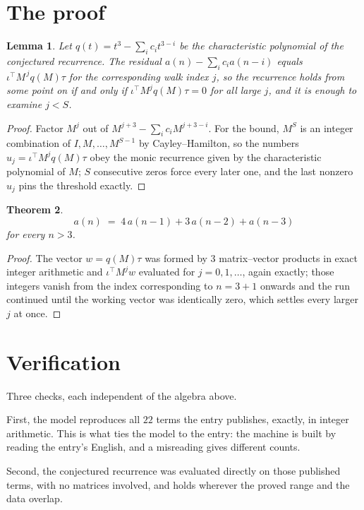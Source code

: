 \documentclass[11pt,a4paper]{article}
\theoremstyle{plain}
\newtheorem{theorem}{Theorem}
\newtheorem{lemma}[theorem]{Lemma}
\theoremstyle{definition}
\begin{document}
\section{The proof}

\begin{lemma}\label{lem:crit}
Let $q(t)=t^{3}-\sum_i c_it^{3-i}$ be the characteristic polynomial of the
conjectured recurrence. The residual $a(n)-\sum_ic_ia(n-i)$ equals
$\iota^{\!\top}M^{\,j}q(M)\tau$ for the corresponding walk index $j$, so the recurrence
holds from some point on if and only if $\iota^{\!\top}M^{j}q(M)\tau=0$ for all large $j$,
and it is enough to examine $j<S$.
\end{lemma}

\begin{proof}
Factor $M^{j}$ out of $M^{j+3}-\sum_ic_iM^{j+3-i}$. For the bound, $M^{S}$
is an integer combination of $I,M,\dots,M^{S-1}$ by Cayley--Hamilton, so the numbers
$u_j=\iota^{\!\top}M^{j}q(M)\tau$ obey the monic recurrence given by the characteristic
polynomial of $M$; $S$ consecutive zeros force every later one, and the last nonzero $u_j$
pins the threshold exactly.
\end{proof}

\begin{theorem}
\[
a(n)\;=\;4\,a(n-1) + 3\,a(n-2) + a(n-3)
\]
for every $n>3$.
\end{theorem}

\begin{proof}
The vector $w=q(M)\tau$ was formed by $3$ matrix--vector products in exact integer
arithmetic and $\iota^{\!\top}M^{j}w$ evaluated for $j=0,1,\dots$, again exactly; those
integers vanish from the index corresponding to $n=3+1$ onwards and the run continued
until the working vector was identically zero, which settles every larger $j$ at once.
\end{proof}

\section{Verification}

Three checks, each independent of the algebra above.

First, the model reproduces all $22$ terms the entry publishes, exactly, in integer
arithmetic. This is what ties the model to the entry: the machine is built by reading the
entry's English, and a misreading gives different counts.

Second, the conjectured recurrence was evaluated directly on those published terms, with no
matrices involved, and holds wherever the proved range and the data overlap.
\end{document}
